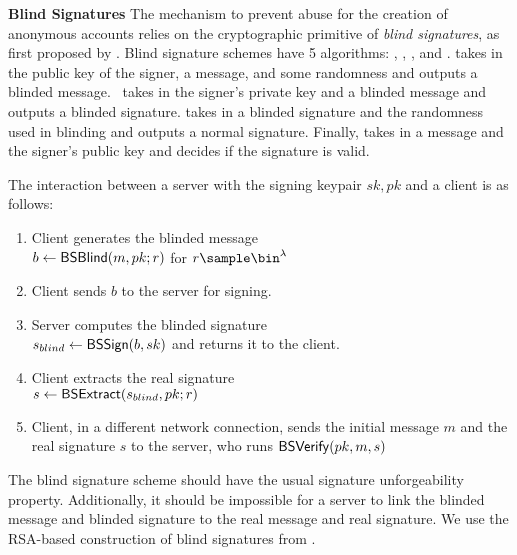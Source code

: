 \medskip \noindent
\textbf{Blind Signatures}
The mechanism to prevent abuse for the creation of anonymous accounts relies on the 
cryptographic primitive of \emph{blind signatures}, as first proposed by
\cite{C:Chaum82}. Blind signature schemes
have 5 algorithms: \bskeygen, \bsblind, \bssign, \bsextract and \bsverify.  
\bsblind takes in the public key of the signer, a message, and some randomness and
outputs a blinded message.%
\ \bssign takes in
the signer's private key and a blinded message and outputs a 
blinded signature.  \bsextract takes in
a blinded signature and the randomness used in blinding and outputs a normal 
signature.  Finally, \bsverify takes in a message and the 
signer's public key and decides if the signature is valid.


The interaction between a server with the signing keypair $sk, pk$ and a client is as follows:
\begin{enumerate}[noitemsep]
  \item Client generates the blinded message %
  \\ $b \gets \mathsf{BSBlind}(m, pk;r)$ for $r \sample \bin^\securityparameter$
  \item Client sends $b$ to the server for signing.
  \item Server computes the blinded signature 
  \\ $s_{blind} \gets \mathsf{BSSign}(b,sk)$ and returns it to the client.
  \item Client extracts the real signature %
  \\ $s \gets \mathsf{BSExtract}(s_{blind}, pk; r)$
  \item Client, in a different network connection, sends the initial message $m$ and the real signature $s$ to the server, who runs $\mathsf{BSVerify}(pk,m,s)$ 
\end{enumerate}
The blind signature scheme should have the usual signature
unforgeability property.  Additionally, it should be impossible for a
server to link the blinded message and blinded signature to the real
message and real signature.  We use the RSA-based construction of blind
signatures from \cite{C:Chaum82}.
